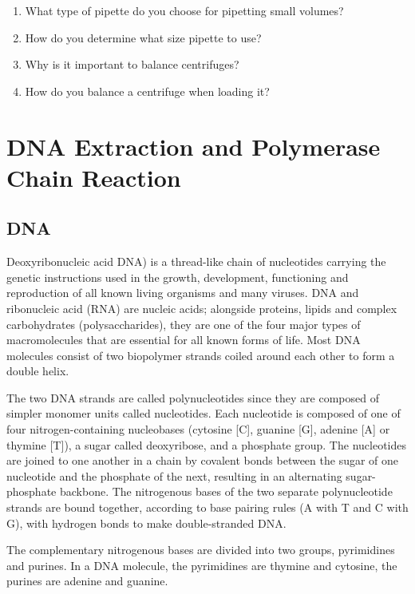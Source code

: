 \documentclass[]{book}
\providecommand{\tightlist}{%
  \setlength{\itemsep}{0pt}\setlength{\parskip}{0pt}}
\begin{document}
\begin{enumerate}
\def\labelenumi{\arabic{enumi}.}
\tightlist
\item
  What type of pipette do you choose for pipetting small volumes?
\item
  How do you determine what size pipette to use?
\item
  Why is it important to balance centrifuges?
\item
  How do you balance a centrifuge when loading it?
\end{enumerate}

\chapter{DNA Extraction and Polymerase Chain
Reaction}\label{dna-extraction-and-polymerase-chain-reaction}

\section{DNA}\label{dna}

Deoxyribonucleic acid DNA) is a thread-like chain of nucleotides
carrying the genetic instructions used in the growth, development,
functioning and reproduction of all known living organisms and many
viruses. DNA and ribonucleic acid (RNA) are nucleic acids; alongside
proteins, lipids and complex carbohydrates (polysaccharides), they are
one of the four major types of macromolecules that are essential for all
known forms of life. Most DNA molecules consist of two biopolymer
strands coiled around each other to form a double helix.

The two DNA strands are called polynucleotides since they are composed
of simpler monomer units called nucleotides. Each nucleotide is composed
of one of four nitrogen-containing nucleobases (cytosine {[}C{]},
guanine {[}G{]}, adenine {[}A{]} or thymine {[}T{]}), a sugar called
deoxyribose, and a phosphate group. The nucleotides are joined to one
another in a chain by covalent bonds between the sugar of one nucleotide
and the phosphate of the next, resulting in an alternating
sugar-phosphate backbone. The nitrogenous bases of the two separate
polynucleotide strands are bound together, according to base pairing
rules (A with T and C with G), with hydrogen bonds to make
double-stranded DNA.

The complementary nitrogenous bases are divided into two groups,
pyrimidines and purines. In a DNA molecule, the pyrimidines are thymine
and cytosine, the purines are adenine and guanine.
\end{document}

